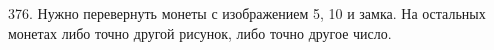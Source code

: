 376. Нужно перевернуть монеты с изображением 5, 10 и замка. На остальных монетах либо точно другой рисунок, либо точно другое число.\\
